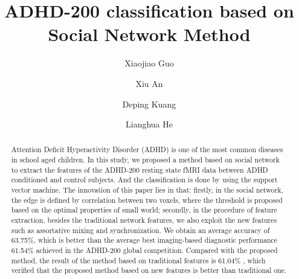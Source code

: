 \documentclass{llncs}
\begin{document}
%
\frontmatter          %
%
\pagestyle{headings}  %
%

%
\mainmatter              %
%
\title{ADHD-200 classification based on Social Network Method }
%
%
\author{Xiaojiao Guo \and Xiu An
 \and Deping Kuang \and Lianghua He}
%
%
%


\maketitle              %

\begin{abstract}
Attention Deficit Hyperactivity Disorder (ADHD) is one of the most common diseases in school aged children. In this study, we proposed a method based on social network to extract the features of the ADHD-200 resting state fMRI data between ADHD conditioned and control subjects. And the classification is done by using the support vector machine. The innovation of this paper lies in that: firstly, in the social network, the edge is defined by correlation between two voxels, where the threshold is proposed based on the optimal properties of small world; secondly, in the procedure of feature extraction, besides the traditional network features, we also exploit the new features such as assortative mixing and synchronization. We obtain an average accuracy of 63.75\%, which is better than the average best imaging-based diagnostic performance 61.54\% achieved in the ADHD-200 global competition. Compared with the proposed method, the result of the method based on traditional features is 61.04\% , which verified that the proposed method based on new features is better than traditional one.
\end{abstract}
%
\end{document}
